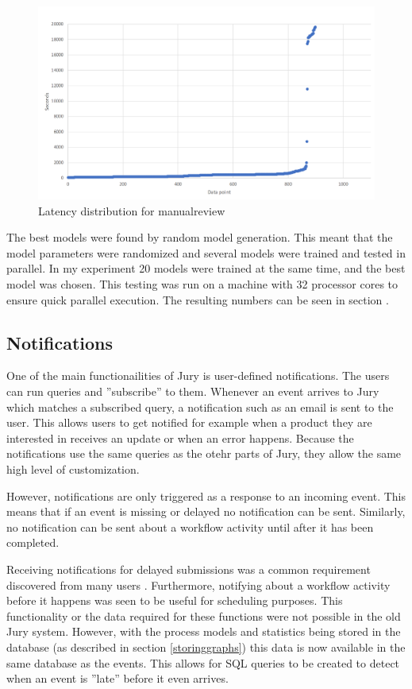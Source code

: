 \begin{figure}[htb]
    \centering \includegraphics[width=0.6\linewidth]{gfx/manualreview.png}
    \caption{Latency distribution for manualreview }
    \label{fig:manualreview}
\end{figure}

The best models were found by random model generation.
This meant that the model parameters were randomized and several models were trained and tested in parallel.
In my experiment 20 models were trained at the same time, and the best model was chosen.
This testing was run on a machine with 32 processor cores to ensure quick parallel execution. 
The resulting numbers can be seen in section .

\subsection{Notifications}
\label{sec:notifications}

One of the main functionailities of Jury is user-defined notifications.
The users can run queries and ''subscribe'' to them.
Whenever an event arrives to Jury which matches a subscribed query, a notification such as an email is sent to the user.
This allows users to get notified for example when a product they are interested in receives an update or when an error happens.
Because the notifications use the same queries as the otehr parts of Jury, they allow the same high level of customization.

However, notifications are only triggered as a response to an incoming event.
This means that if an event is missing or delayed no notification can be sent.
Similarly, no notification can be sent about a workflow activity until after it has been completed.

Receiving notifications for delayed submissions was a common requirement discovered from many users .
Furthermore, notifying about a workflow activity before it happens was seen to be useful for scheduling purposes.
This functionality or the data required for these functions were not possible in the old Jury system.
However, with the process models and statistics being stored in the database (as described in section \ref{storinggraphs}) this data is now available in the same database as the events.
This allows for SQL queries to be created to detect when an event is ''late'' before it even arrives.

